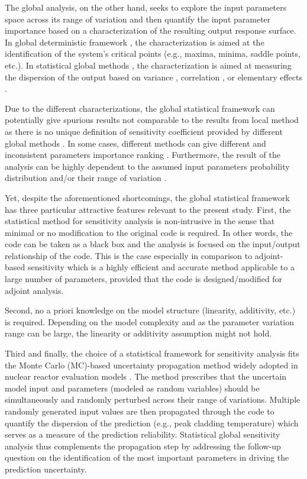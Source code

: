 The global analysis, on the other hand, 
seeks to explore the input parameters space across its range of variation 
and then quantify the input parameter importance based on a characterization of the resulting output response surface. 
In global deterministic framework \cite{Ionescu-Bujor2004,Cacuci2010}, 
the characterization is aimed at the identification of the system’s critical points (e.g., maxima, minima, saddle points, etc.). 
In statistical global methods \cite{Saltelli2008, Saltelli2004, Saltelli2006}, 
the characterization is aimed at measuring the dispersion of the output based on variance \cite{Sobol2001,Cukier1978}, 
correlation \cite{Helton1993}, or elementary effects \cite{Morris1991}.

Due to the different characterizations, 
the global statistical framework can potentially give spurious results not comparable to the results from local method 
as there is no unique definition of sensitivity coefficient provided by different global methods \cite{Razavi2015}. 
In some cases, different methods can give different and inconsistent parameters importance ranking \cite{Saltelli2008,Saltelli2004}. 
Furthermore, the result of the analysis can be highly dependent to the assumed input parameters probability distribution and/or their range of variation \cite{Cacuci2004,Cacuci2010}.

Yet, despite the aforementioned shortcomings, 
the global statistical framework has three particular attractive features relevant to the present study. 
First, the statistical method for sensitivity analysis is non-intrusive in the sense that minimal or no modification to the original code is required. 
In other words, the code can be taken as a black box and the analysis is focused on the input/output relationship \cite{Saltelli2008} of the code. 
This is the case especially in comparison to adjoint-based sensitivity \cite{Cacuci2000,Ionescu-Bujor2000} which is a highly efficient and accurate method applicable to a large number of parameters, 
provided that the code is designed/modified for adjoint analysis.

Second, no a priori knowledge on the model structure (linearity, additivity, etc.) is required. 
Depending on the model complexity and as the parameter variation range can be large, 
the linearity or additivity assumption might not hold.

Third and finally, 
the choice of a statistical framework for sensitivity analysis fits the Monte Carlo (MC)-based uncertainty propagation method widely adopted in nuclear reactor evaluation models \cite{Boyack1990, Nutt2004, Wallis2007, Glaeser2008}. 
The method prescribes that the uncertain model input and parameters (modeled as random variables) 
should be simultaneously and randomly perturbed across their range of variations. 
Multiple randomly generated input values are then propagated through the code to quantify the dispersion of the prediction (e.g., peak cladding temperature) 
which serves as a measure of the prediction reliability. 
Statistical global sensitivity analysis thus complements the propagation step 
by addressing the follow-up question on the identification of the most important parameters in driving the prediction uncertainty. 

